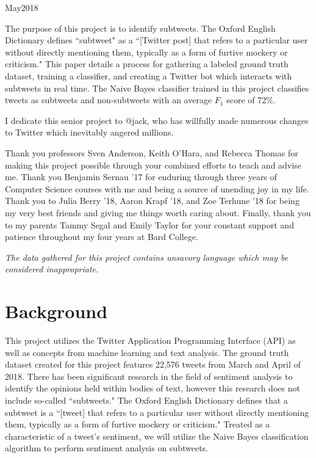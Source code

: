 \documentclass[11pt, twoside, reqno]{book}
\begin{document}
    {May}{2018}

\abstr

The purpose of this project is to identify subtweets. The Oxford English Dictionary defines ``subtweet" as a ``[Twitter post] that refers to a particular user without directly mentioning them, typically as a form of furtive mockery or criticism." This paper details a process for gathering a labeled ground truth dataset, training a classifier, and creating a Twitter bot which interacts with subtweets in real time. The Naive Bayes classifier trained in this project classifies tweets as subtweets and non-subtweets with an average $F_{1}$ score of 72\%. 

\tableofcontents

\dedic

I dedicate this senior project to @jack, who has willfully made numerous changes to Twitter which inevitably angered millions.

\acknowl

Thank you professors Sven Anderson, Keith O'Hara, and Rebecca Thomas for making this project possible through your combined efforts to teach and advise me. Thank you Benjamin Sernau '17 for enduring through three years of Computer Science courses with me and being a source of unending joy in my life. Thank you to Julia Berry '18, Aaron Krapf '18, and Zoe Terhune '18 for being my very best friends and giving me things worth caring about. Finally, thank you to my parents Tammy Segal and Emily Taylor for your constant support and patience throughout my four years at Bard College. 

\startmain


\intro

\textit{The data gathered for this project contains unsavory language which may be considered inappropriate.}

\section{Background}
\label{background}

This project utilizes the Twitter Application Programming Interface (API) as well as concepts from machine learning and text analysis. The ground truth dataset created for this project features 22,576 tweets from March and April of 2018. There has been significant research in the field of sentiment analysis to identify the opinions held within bodies of text, however this research does not include so-called ``subtweets." The Oxford English Dictionary defines that a subtweet is a ``[tweet] that refers to a particular user without directly mentioning them, typically as a form of furtive mockery or criticism." Treated as a characteristic of a tweet's sentiment, we will utilize the Naive Bayes classification algorithm to perform sentiment analysis on subtweets.
\end{document}

